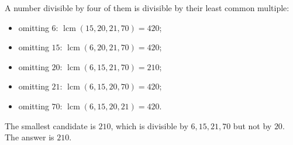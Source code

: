 A number divisible by four of them is divisible by their least common multiple:
\begin{itemize}
\item omitting $6$: $\operatorname{lcm}(15,20,21,70)=420$;
\item omitting $15$: $\operatorname{lcm}(6,20,21,70)=420$;
\item omitting $20$: $\operatorname{lcm}(6,15,21,70)=210$;
\item omitting $21$: $\operatorname{lcm}(6,15,20,70)=420$;
\item omitting $70$: $\operatorname{lcm}(6,15,20,21)=420$.
\end{itemize}
The smallest candidate is $210$, which is divisible by $6,15,21,70$ but not by $20$. The answer is $\boxed{210}$.
